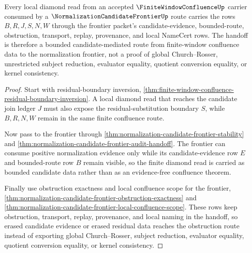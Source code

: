 \begin{theorem}
\label{thm:finite-window-confluence-normalization-frontier-handoff}
Every local diamond read from an accepted $\FiniteWindowConfluenceUp$ carrier consumed by a $\NormalizationCandidateFrontierUp$ route carries the rows $B,R,J,S,N,W$ through the frontier packet's candidate-evidence, bounded-route, obstruction, transport, replay, provenance, and local NameCert rows. The handoff is therefore a bounded candidate-mediated route from finite-window confluence data to the normalization frontier, not a proof of global Church--Rosser, unrestricted subject reduction, evaluator equality, quotient conversion equality, or kernel consistency.
\end{theorem}
\begin{proof}
Start with residual-boundary inversion, \autoref{thm:finite-window-confluence-residual-boundary-inversion}. A local diamond read that reaches the candidate join ledger $J$ must also expose the residual-substitution boundary $S$, while $B,R,N,W$ remain in the same finite confluence route.

Now pass to the frontier through \autoref{thm:normalization-candidate-frontier-stability} and \autoref{thm:normalization-candidate-frontier-audit-handoff}. The frontier can consume positive normalization evidence only while its candidate-evidence row $E$ and bounded-route row $B$ remain visible, so the finite diamond read is carried as bounded candidate data rather than as an evidence-free confluence theorem.

Finally use obstruction exactness and local confluence scope for the frontier, \autoref{thm:normalization-candidate-frontier-obstruction-exactness} and \autoref{thm:normalization-candidate-frontier-local-confluence-scope}. These rows keep obstruction, transport, replay, provenance, and local naming in the handoff, so erased candidate evidence or erased residual data reaches the obstruction route instead of exporting global Church--Rosser, subject reduction, evaluator equality, quotient conversion equality, or kernel consistency.
\end{proof}

